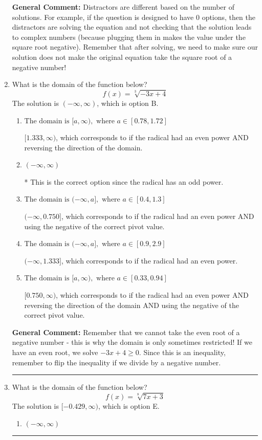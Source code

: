 \documentclass{extbook}[14pt]
\newcommand{\litem}[1]{\item #1

\rule{\textwidth}{0.4pt}}
\begin{document}
\begin{enumerate}
{\textbf{General Comment:} Distractors are different based on the number of solutions. For example, if the question is designed to have 0 options, then the distractors are solving the equation and not checking that the solution leads to complex numbers (because plugging them in makes the value under the square root negative). Remember that after solving, we need to make sure our solution does not make the original equation take the square root of a negative number!
}
\litem{
What is the domain of the function below?
\[ f(x) = \sqrt[3]{-3 x + 4} \]
The solution is \( (-\infty, \infty) \), which is option B.\begin{enumerate}[label=\Alph*.]
\item \( \text{The domain is } [a, \infty), \text{   where } a \in [0.78, 1.72] \)

$[1.333, \infty)$, which corresponds to if the radical had an even power AND reversing the direction of the domain.
\item \( (-\infty, \infty) \)

* This is the correct option since the radical has an odd power.
\item \( \text{The domain is } (-\infty, a], \text{   where } a \in [0.4, 1.3] \)

$(-\infty, 0.750]$, which corresponds to if the radical had an even power AND using the negative of the correct pivot value.
\item \( \text{The domain is } (-\infty, a], \text{   where } a \in [0.9, 2.9] \)

$(-\infty, 1.333]$, which corresponds to if the radical had an even power.
\item \( \text{The domain is } [a, \infty), \text{   where } a \in [0.33, 0.94] \)

$[0.750, \infty)$, which corresponds to if the radical had an even power AND reversing the direction of the domain AND using the negative of the correct pivot value.
\end{enumerate}

\textbf{General Comment:} Remember that we cannot take the even root of a negative number - this is why the domain is only sometimes restricted! If we have an even root, we solve $-3 x + 4 \geq 0$. Since this is an inequality, remember to flip the inequality if we divide by a negative number.
}
\litem{
What is the domain of the function below?
\[ f(x) = \sqrt[8]{7 x + 3} \]
The solution is \( [-0.429, \infty) \), which is option E.\begin{enumerate}[label=\Alph*.]
\item \( (-\infty, \infty) \)


\end{enumerate}}
\end{enumerate}
\end{document}
